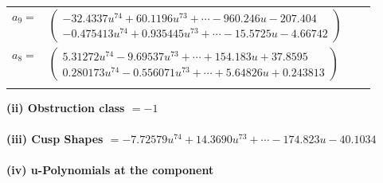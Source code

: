 \documentclass[1p]{elsarticle_modified}
\theoremstyle{definition}
\begin{document}
\begin{tabular}{m{7pt} m{180pt} m{7pt} m{180pt} }
\flushright $a_{9}=$&$\begin{pmatrix}-32.4337 u^{74}+60.1196 u^{73}+\cdots-960.246 u-207.404\\-0.475413 u^{74}+0.935445 u^{73}+\cdots-15.5725 u-4.66742\end{pmatrix}$ \\
\flushright $a_{8}=$&$\begin{pmatrix}5.31272 u^{74}-9.69537 u^{73}+\cdots+154.183 u+37.8595\\0.280173 u^{74}-0.556071 u^{73}+\cdots+5.64826 u+0.243813\end{pmatrix}$\\&\end{tabular}
\flushleft \textbf{(ii) Obstruction class $= -1$}\\~\\
\flushleft \textbf{(iii) Cusp Shapes $= -7.72579 u^{74}+14.3690 u^{73}+\cdots-174.823 u-40.1034$}\\~\\
\newpage\renewcommand{\arraystretch}{1}
\flushleft \textbf{(iv) u-Polynomials at the component}\newline \\
\end{document}
